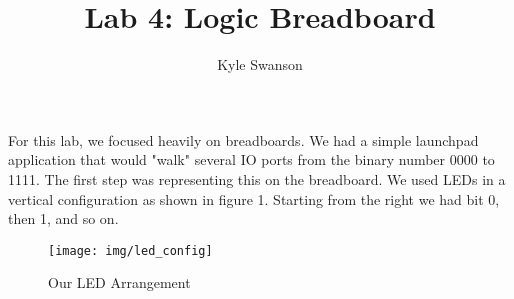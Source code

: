 \documentclass[12pt,a4paper]{report}
\author{Kyle Swanson}
\title{Lab 4: Logic Breadboard}
\begin{document}
\maketitle

\paragraph{}
For this lab, we focused heavily on breadboards. We had a simple launchpad application that would "walk" several IO ports from the binary number 0000 to 1111. The first step was representing this on the breadboard. We used LEDs in a vertical configuration as shown in figure 1. Starting from the right we had bit 0, then 1, and so on. \\
\begin{figure}
	\centering
	\texttt{[image: img/led\_config]} \\
	\caption{Our LED Arrangement}
\end{figure}
\end{document}
